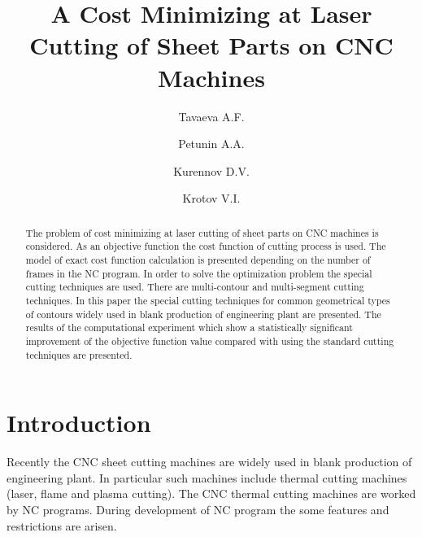 \documentclass[runningheads]{llncs}
\begin{document}
\title{A Cost Minimizing at Laser Cutting of Sheet Parts on CNC Machines}


\author{
  Tavaeva A.F. 
  \and
  Petunin A.A. 
  \and
  Kurennov D.V. 
  \and Krotov V.I. 
}

\maketitle              %

\begin{abstract}
The problem of cost minimizing at laser cutting of sheet parts on CNC machines is considered.
As an objective function the cost function of cutting process is used.
The model of exact cost function calculation is presented
depending on the number of frames in the NC program.
In order to solve the optimization problem the special cutting techniques are used.
There are multi-contour and multi-segment cutting techniques.
In this paper the special cutting techniques for common geometrical types of
contours widely used in blank production of engineering plant are presented.
The results of the computational experiment
which show a statistically significant improvement
of the objective function value compared
with using the standard cutting techniques are presented.

\end{abstract}

\section{Introduction}

Recently the CNC sheet cutting machines are widely used in blank production of engineering plant.
In particular such machines include thermal cutting machines (laser, flame and plasma cutting).
The CNC thermal cutting machines are worked by NC programs.
During development of NC program the some features and restrictions are arisen.
\end{document}
